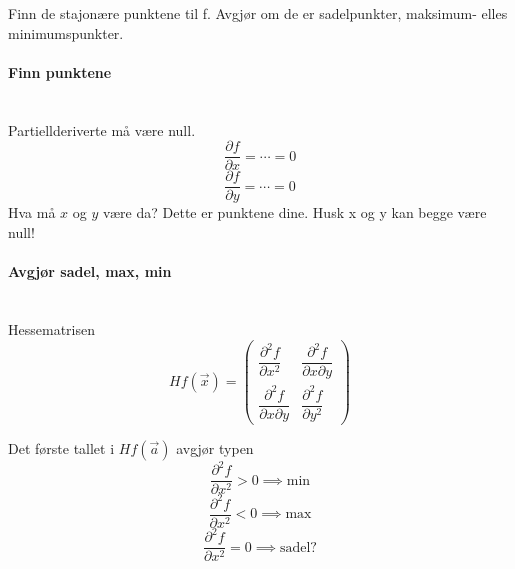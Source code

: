 Finn de stajonære punktene til f.
Avgjør om de er sadelpunkter, maksimum- elles minimumspunkter.



\paragraph{Finn punktene} \mbox{} \\
Partiellderiverte må være null.
$$\frac{\partial f}{\partial x} = \cdots = 0$$
$$\frac{\partial f}{\partial y} = \cdots = 0$$
Hva må $x$ og $y$ være da?
Dette er punktene dine.
Husk x og y kan begge være null!



\paragraph{Avgjør sadel, max, min} \mbox{} \\
Hessematrisen
$$Hf(\vec{x}) = \begin{pmatrix}
                \dfrac{\partial^2f}{\partial x^2}
                  & \dfrac{\partial^2f}{\partial x \partial y} \\[18pt]
                \dfrac{\partial^2f}{\partial x \partial y}
                  & \dfrac{\partial^2f}{\partial y^2}
                \end{pmatrix}$$

Det første tallet i $Hf(\vec{a})$ avgjør typen
$$\frac{\partial^2f}{\partial x^2} > 0 \implies \text{min}$$
$$\frac{\partial^2f}{\partial x^2} < 0 \implies \text{max}$$
$$\frac{\partial^2f}{\partial x^2} = 0 \implies \text{sadel?}$$
